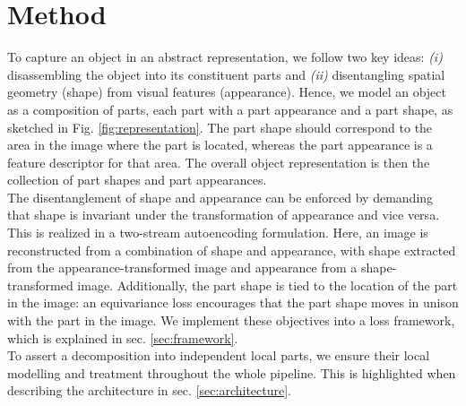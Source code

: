 \chapter{Method}\label{sec:method}

	To capture an object in an abstract representation, we follow two key ideas: \emph{(i)} disassembling the object into its constituent parts and \emph{(ii)} disentangling spatial geometry (shape) from visual features (appearance). Hence, we model an object as a composition of parts, each part with a part appearance and a part shape, as sketched in Fig. \ref{fig:representation}. The part shape should correspond to the area in the image where the part is located, whereas the part appearance is a feature descriptor for that area. The overall object representation is then the collection of part shapes and part appearances. \\
	The disentanglement of shape and appearance can be enforced by demanding that shape is invariant under the transformation of appearance and vice versa. This is realized in a two-stream autoencoding formulation. Here, an image is reconstructed from a combination of shape and appearance, with shape extracted from the appearance-transformed image and appearance from a shape-transformed image. Additionally, the part shape is tied to the location of the part in the image: an equivariance loss encourages that the part shape moves in unison with the part in the image. We implement these objectives into a loss framework, which is explained in sec. \ref{sec:framework}. \\
	To assert a decomposition into independent local parts, we ensure their local modelling and treatment throughout the whole pipeline. This is highlighted when describing the architecture in sec. \ref{sec:architecture}.

